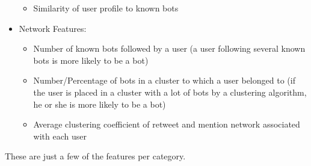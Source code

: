 \begin{itemize}
\begin{itemize}
                \item Similarity of user profile to known bots
            \end{itemize}
        \item Network Features:
            \begin{itemize}
                \item Number of known bots followed by a user (a user following several known bots is more likely to be a bot)
                \item Number/Percentage of bots in a cluster to which a user belonged to (if the user is placed in a cluster with a lot of bots by a clustering algorithm, he or she is more likely to be a bot)
                \item Average clustering coefficient of retweet and mention network associated with each user

            \end{itemize}
    \end{itemize}
    These are just a few of the features per category.
    
    
    
    
    

